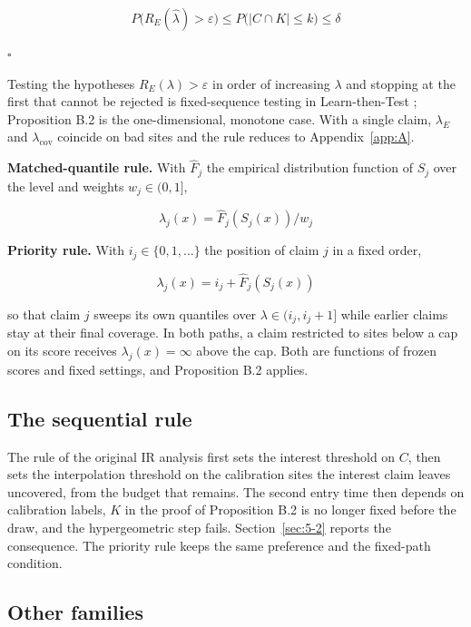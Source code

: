 \documentclass{iopjournal}
\begin{document}
\[
P\big(R_E(\hat\lambda) > \varepsilon\big) \le P\big(|C \cap K| \le k\big) \le \delta
\]

\(\square\)

Testing the hypotheses \(R_E(\lambda) > \varepsilon\) in order of increasing \(\lambda\) and stopping at the first that cannot be rejected is fixed-sequence testing in Learn-then-Test \cite{Angelopoulos2025}; Proposition B.2 is the one-dimensional, monotone case. With a single claim, \(\lambda_E\) and \(\lambda_{\mathrm{cov}}\) coincide on bad sites and the rule reduces to Appendix~\ref{app:A}.

\textbf{Matched-quantile rule.} With \(\hat F_j\) the empirical distribution function of \(S_j\) over the level and weights \(w_j \in (0, 1]\),

\[
\lambda_j(x) = \hat F_j(S_j(x)) / w_j
\]

\textbf{Priority rule.} With \(i_j \in \{0, 1, \dots\}\) the position of claim \(j\) in a fixed order,

\[
\lambda_j(x) = i_j + \hat F_j(S_j(x))
\]

so that claim \(j\) sweeps its own quantiles over \(\lambda \in (i_j, i_j + 1]\) while earlier claims stay at their final coverage. In both paths, a claim restricted to sites below a cap on its score receives \(\lambda_j(x) = \infty\) above the cap. Both are functions of frozen scores and fixed settings, and Proposition B.2 applies.

\hypertarget{the-sequential-rule}{%
\subsection{The sequential rule}\label{the-sequential-rule}}

The rule of the original IR analysis first sets the interest threshold on \(C\), then sets the interpolation threshold on the calibration sites the interest claim leaves uncovered, from the budget that remains. The second entry time then depends on calibration labels, \(K\) in the proof of Proposition B.2 is no longer fixed before the draw, and the hypergeometric step fails. Section~\ref{sec:5-2} reports the consequence. The priority rule keeps the same preference and the fixed-path condition.

\hypertarget{other-families}{%
\subsection{Other families}\label{other-families}}
\end{document}

